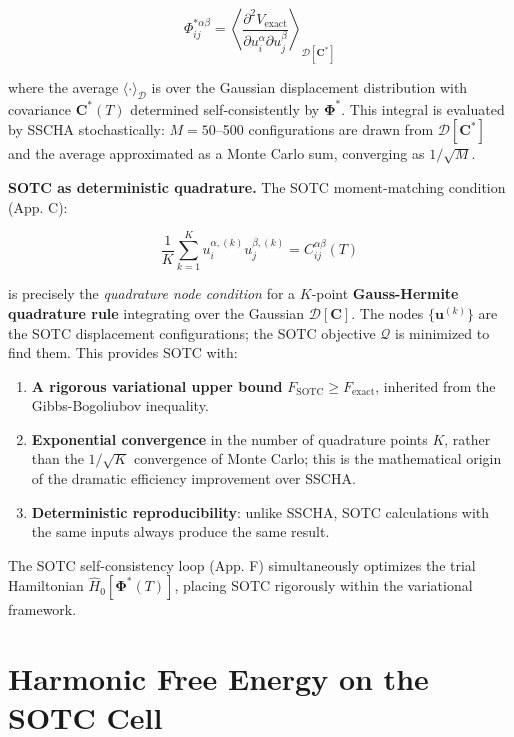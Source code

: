 \documentclass[aps,prb,reprint,amsmath,amssymb,floatfix]{revtex4-2}
\providecommand{\tightlist}{\setlength{\itemsep}{0pt}\setlength{\parskip}{0pt}}
\begin{document}
\begin{equation*}
\Phi_{ij}^{*\alpha\beta} = \left\langle\frac{\partial^2 V_\text{exact}}{\partial u_i^\alpha\partial u_j^\beta}\right\rangle_{\mathcal{D}[\mathbf{C}^*]}
\end{equation*}

where the average \(\langle\cdot\rangle_\mathcal{D}\) is over the
Gaussian displacement distribution with covariance \(\mathbf{C}^*(T)\)
determined self-consistently by \(\boldsymbol{\Phi}^*\). This integral
is evaluated by SSCHA stochastically: \(M = 50\)--500 configurations are
drawn from \(\mathcal{D}[\mathbf{C}^*]\) and the average approximated as
a Monte Carlo sum, converging as \(1/\sqrt{M}\).

\textbf{SOTC as deterministic quadrature.} The SOTC moment-matching
condition (App. C):

\begin{equation*}
\frac{1}{K}\sum_{k=1}^K u_i^{\alpha,(k)}u_j^{\beta,(k)} = C_{ij}^{\alpha\beta}(T)
\end{equation*}

is precisely the \emph{quadrature node condition} for a \(K\)-point
\textbf{Gauss-Hermite quadrature rule} integrating over the Gaussian
\(\mathcal{D}[\mathbf{C}]\). The nodes \(\{\mathbf{u}^{(k)}\}\) are the
SOTC displacement configurations; the SOTC objective \(\mathcal{Q}\) is
minimized to find them. This provides SOTC with:

\begin{enumerate}
\def\labelenumi{\arabic{enumi}.}
\tightlist
\item
  \textbf{A rigorous variational upper bound}
  \(F_\text{SOTC} \geq F_\text{exact}\), inherited from the
  Gibbs-Bogoliubov inequality.
\item
  \textbf{Exponential convergence} in the number of quadrature points
  \(K\), rather than the \(1/\sqrt{K}\) convergence of Monte Carlo; this
  is the mathematical origin of the dramatic efficiency improvement over
  SSCHA.
\item
  \textbf{Deterministic reproducibility}: unlike SSCHA, SOTC
  calculations with the same inputs always produce the same result.
\end{enumerate}

The SOTC self-consistency loop (App. F) simultaneously optimizes the
trial Hamiltonian \(\hat{H}_0[\boldsymbol{\Phi}^*(T)]\), placing SOTC
rigorously within the variational framework.


\section{Harmonic Free Energy on the SOTC
Cell}\label{appendix-h-harmonic-free-energy-on-the-sotc-cell}
\end{document}
